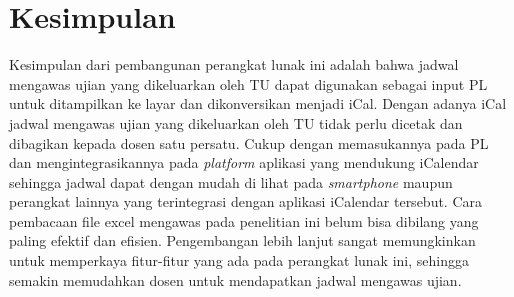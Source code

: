 \chapter{Kesimpulan}
\label{chap:summary}

Kesimpulan dari pembangunan perangkat lunak ini adalah bahwa jadwal mengawas ujian yang dikeluarkan oleh TU dapat digunakan sebagai input PL untuk ditampilkan ke layar dan dikonversikan menjadi iCal. Dengan adanya iCal jadwal mengawas ujian yang dikeluarkan oleh TU tidak perlu dicetak dan dibagikan kepada dosen satu persatu. Cukup dengan memasukannya pada PL dan mengintegrasikannya pada \textit{platform} aplikasi yang mendukung iCalendar sehingga jadwal dapat dengan mudah di lihat pada \textit{smartphone} maupun perangkat lainnya yang terintegrasi dengan aplikasi iCalendar tersebut. Cara pembacaan file excel mengawas pada penelitian ini belum bisa dibilang yang paling efektif dan efisien. Pengembangan lebih lanjut sangat memungkinkan untuk memperkaya fitur-fitur yang ada pada perangkat lunak ini, sehingga semakin memudahkan dosen untuk mendapatkan jadwal mengawas ujian.  
